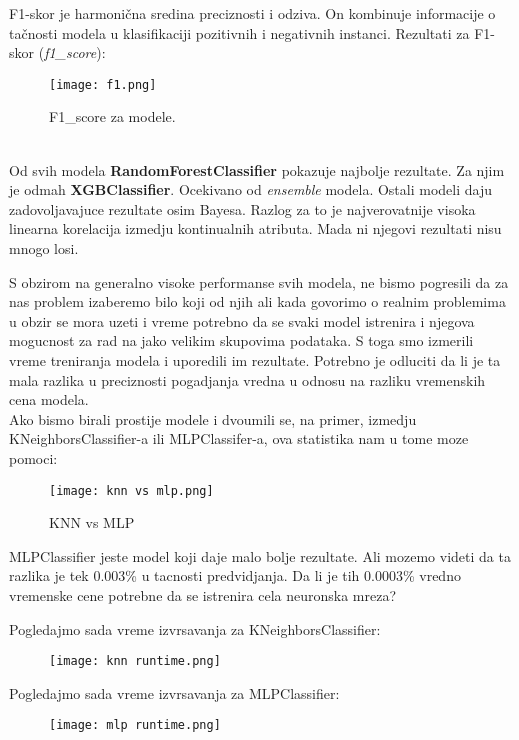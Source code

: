 \documentclass[10pt]{article}
\begin{document}
F1-skor je harmonična sredina preciznosti i odziva. On kombinuje informacije o tačnosti modela u klasifikaciji pozitivnih i negativnih instanci. Rezultati za F1-skor (\textit{f1\_score}):
\begin{figure}[h]
    \centering
    \texttt{[image: f1.png]}
    \caption{F1\_score za modele.}
    \label{Slika4}
\end{figure}
\\

Od svih modela \textbf{RandomForestClassifier} pokazuje najbolje rezultate. Za njim je odmah \textbf{XGBClassifier}. Ocekivano od \textit{ensemble} modela. Ostali modeli daju zadovoljavajuce rezultate
osim Bayesa. Razlog za to je najverovatnije visoka linearna korelacija izmedju kontinualnih atributa. Mada ni njegovi rezultati nisu mnogo losi.\pagebreak

S obzirom na generalno visoke performanse svih modela, ne bismo pogresili da za nas problem izaberemo bilo koji od njih ali kada govorimo o realnim problemima u obzir se mora uzeti i vreme potrebno da se svaki model istrenira i njegova mogucnost za rad na jako velikim skupovima podataka. S toga smo izmerili vreme treniranja modela i uporedili im rezultate. Potrebno je odluciti da li je ta mala razlika u preciznosti pogadjanja vredna u odnosu na razliku vremenskih cena modela.\\

Ako bismo birali prostije modele i dvoumili se, na primer, izmedju KNeighborsClassifier-a ili MLPClassifer-a, ova statistika nam u tome moze pomoci: 
\begin{figure}[h]
    \centering
    \texttt{[image: knn vs mlp.png]}
    \caption{KNN vs MLP}
    \label{Slika5}
\end{figure}

MLPClassifier jeste model koji daje malo bolje rezultate. Ali mozemo videti da ta razlika je tek 0.003\% u tacnosti predvidjanja. Da li je tih 0.0003\% vredno vremenske cene potrebne da se istrenira cela neuronska mreza? 

\pagebreak
Pogledajmo sada vreme izvrsavanja za KNeighborsClassifier:
\begin{figure}[h]
    \centering
    \texttt{[image: knn runtime.png]}
    \label{Slika6}
\end{figure}

Pogledajmo sada vreme izvrsavanja za MLPClassifier:
\begin{figure}[h]
    \centering
    \texttt{[image: mlp runtime.png]}
    \label{Slika7}
\end{figure}
\end{document}
